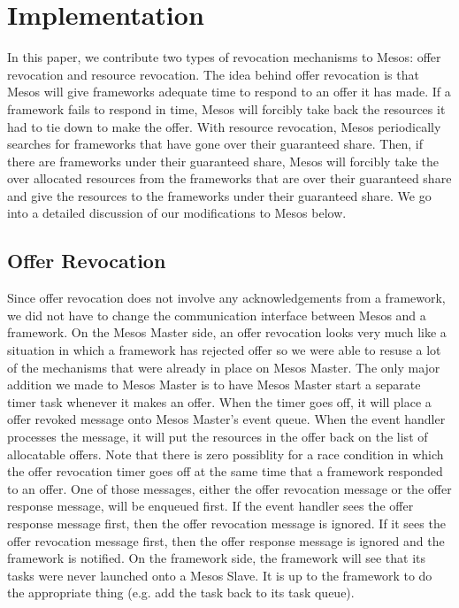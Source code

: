 \section{Implementation}


In this paper, we contribute two types of revocation mechanisms to Mesos: offer revocation and resource
revocation. The idea behind offer revocation is that Mesos will give frameworks adequate time to respond
to an offer it has made. If a framework fails to respond in time, Mesos will forcibly take back the
resources it had to tie down to make the offer. With resource revocation, Mesos periodically searches
for frameworks that have gone over their guaranteed share. Then, if there are frameworks under their
guaranteed share, Mesos will forcibly take the over allocated resources from the frameworks that are
over their guaranteed share and give the resources to the frameworks under their guaranteed share. We
go into a detailed discussion of our modifications to Mesos below.

\subsection{Offer Revocation}
Since offer revocation does not involve any acknowledgements from a framework, we did not have to change
the communication interface between Mesos and a framework. On the Mesos Master side, an offer revocation
looks very much like a situation in which a framework has rejected offer so we were able to resuse a
lot of the mechanisms that were already in place on Mesos Master. The only major addition we made to
Mesos Master is to have Mesos Master start a separate timer task whenever it makes an offer. When the
timer goes off, it will place a offer revoked message onto Mesos Master's event queue. When the event
handler processes the message, it will put the resources in the offer back on the list of allocatable
offers. Note that there is zero possiblity for a race condition in which the offer revocation timer goes
off at the same time that a framework responded to an offer. One of those messages, either the offer
revocation message or the offer response message, will be enqueued first. If the event handler sees 
the offer response message first, then the offer revocation message is ignored. If it sees the offer
revocation message first, then the offer response message is ignored and the framework is notified. On
the framework side, the framework will see that its tasks were never launched onto a Mesos Slave. It
is up to the framework to do the appropriate thing (e.g. add the task back to its task queue).


